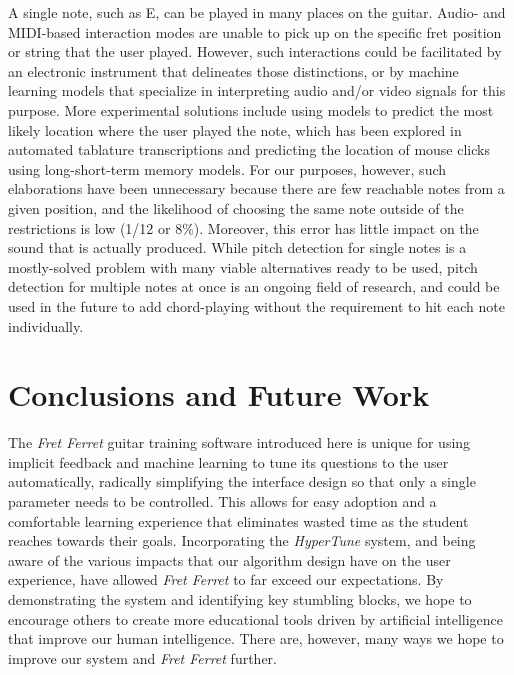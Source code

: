 \documentclass[manuscript, nonacm]{acmart_no_footer}
\begin{document}
A single note, such as E, can be played in many places on the guitar. Audio- and MIDI-based interaction modes are unable to pick up on the specific fret position or string that the user played. However, such interactions could be facilitated by an electronic instrument that delineates those distinctions\cite{guitar_trainer_physical}, or by machine learning models that specialize in interpreting audio and/or video signals for this purpose. More experimental solutions include using models to predict the most likely location where the user played the note, which has been explored in automated tablature transcriptions\cite{guitar_DL1} and predicting the location of mouse clicks using long-short-term memory models\cite{predict_mouse_click}. For our purposes, however, such elaborations have been unnecessary because there are few reachable notes from a given position, and the likelihood of choosing the same note outside of the restrictions is low (1/12 or 8\%). Moreover, this error has little impact on the sound that is actually produced. While pitch detection for single notes is a mostly-solved problem with many viable alternatives\cite{pitchfinder} ready to be used, pitch detection for multiple notes at once is an ongoing field of research\cite{polyphone_pitch_detection}, and could be used in the future to add chord-playing without the requirement to hit each note individually.

\section{Conclusions and Future Work}

The \textit{Fret Ferret} guitar training software introduced here is unique for using implicit feedback and machine learning to tune its questions to the user automatically, radically simplifying the interface design so that only a single parameter needs to be controlled. This allows for easy adoption and a comfortable learning experience that eliminates wasted time as the student reaches towards their goals. Incorporating the \textit{HyperTune} system, and being aware of the various impacts that our algorithm design have on the user experience, have allowed \textit{Fret Ferret} to far exceed our expectations. By demonstrating the system and identifying key stumbling blocks, we hope to encourage others to create more educational tools driven by artificial intelligence that improve our human intelligence. There are, however, many ways we hope to improve our system and \textit{Fret Ferret} further.
\end{document}
